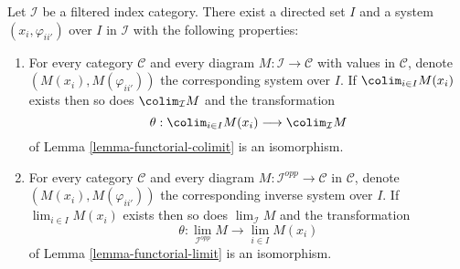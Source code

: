 \begin{lemma}
\label{lemma-directed-category-system}
Let $\mathcal{I}$ be a filtered index category.
There exist a directed set $I$
and a system $(x_i, \varphi_{ii'})$ over $I$ in $\mathcal{I}$
with the following properties:
\begin{enumerate}
\item For every category $\mathcal{C}$ and every diagram
$M : \mathcal{I} \to \mathcal{C}$ with values in $\mathcal{C}$,
denote $(M(x_i), M(\varphi_{ii'}))$
the corresponding system over $I$. If
$\colim_{i \in I} M(x_i)$ exists then so does
$\colim_\mathcal{I} M$ and the transformation
$$
\theta :
\colim_{i \in I} M(x_i)
\longrightarrow
\colim_\mathcal{I} M
$$
of Lemma \ref{lemma-functorial-colimit} is an isomorphism.
\item For every category $\mathcal{C}$ and every diagram
$M : \mathcal{I}^{opp} \to \mathcal{C}$ in $\mathcal{C}$, denote
$(M(x_i), M(\varphi_{ii'}))$ the corresponding inverse system
over $I$. If $\lim_{i \in I} M(x_i)$ exists then so does
$\lim_\mathcal{I} M$ and the transformation
$$
\theta :
\lim_{\mathcal{I}^{opp}} M
\longrightarrow
\lim_{i \in I} M(x_i)
$$
of Lemma \ref{lemma-functorial-limit} is an isomorphism.
\end{enumerate}
\end{lemma}

